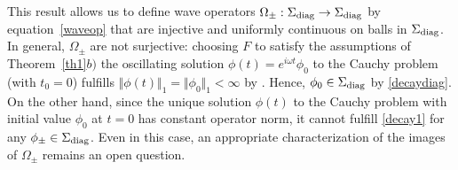 \documentclass[pdftex]{sigma}
\begin{document}
\begin{remark}
This result allows us to def\/ine wave operators $\Omega_\pm:
\Sigma_{\rm diag}\to\Sigma_{\rm diag}$ by equation~\eqref{waveop} that are
injective and uniformly continuous on balls in $\Sigma_{\rm diag}$.
In general, $\Omega_\pm$ are not surjective: choosing $F$ to
satisfy the assumptions of Theorem~\ref{th1}$b)$ the oscillating
solution $\phi(t)=e^{i\omega t}\phi_0$ to the Cauchy problem (with
$t_0=0$) fulf\/ills $\Vert\phi(t)\Vert_1 = \Vert\phi_0\Vert_1 < \infty$
by \cite[Lemma 2]{DJN}. Hence, $\phi_0\in \Sigma_{\rm diag}$ by
\eqref{decaydiag}. On the other hand, since the unique solution
$\phi(t)$ to the Cauchy problem with initial value $\phi_0$ at $t=0$
has constant operator norm, it cannot fulf\/ill \eqref{decay1} for any
$\phi_\pm\in\Sigma_{\rm diag}$. Even in this case, an appropriate
characterization of the images of
$\Omega_\pm$ remains an open question.

\end{remark}
\end{document}
